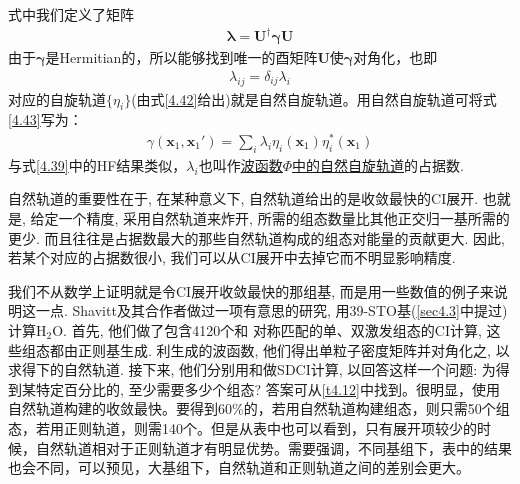 式中我们定义了矩阵
\begin{align}
\bm{\lambda} = \mathbf{U^\dagger}\bm{\gamma}\mathbf{U}
\end{align}
由于$\bm{\gamma}$是Hermitian的，所以能够找到唯一的酉矩阵$\mathbf{U}$使$\bm{\gamma}$对角化，也即
\begin{align}
\lambda_{ij} = \delta_{ij}\lambda_i
\end{align}
对应的自旋轨道$\{\eta_i\}$(由式\eqref{4.42}给出)就是自然自旋轨道。用自然自旋轨道可将式\eqref{4.43}写为：
\begin{align}
\gamma(\mathbf{x}_1,\mathbf{x}_1') = \sum_i \lambda_i \eta_i(\mathbf{x}_1) \eta_i^*(\mathbf{x}_1)
\end{align}
与式\eqref{4.39}中的HF结果类似，$\lambda_i$也叫作\underline{\underline{波函数$\Phi$}中的\underline{自然自旋轨道}}的占据数.

自然轨道的重要性在于, 在某种意义下, 自然轨道给出的是收敛最快的CI展开. 也就是, 给定一个精度, 采用自然轨道来炸开, 所需的组态数量比其他正交归一基所需的更少. 而且往往是占据数最大的那些自然轨道构成的组态对能量的贡献更大. 因此, 若某个对应的占据数很小, 我们可以从CI展开中去掉它而不明显影响精度.

我们不从数学上证明就是令CI展开收敛最快的那组基, 而是用一些数值的例子来说明这一点. Shavitt及其合作者做过一项有意思的研究, 用39-STO基(\ref{sec4.3}中提过)计算$\mathrm{H_2O}$. 首先, 他们做了包含4120个和\mci
{对称匹配}的单、双激发组态的CI计算, 这些组态都由正则\hft 基生成. 利生成的波函数, 他们得出单粒子密度矩阵并对角化之, 以求得下的自然轨道. 接下来, 他们分别用和做SDCI计算, 以回答这样一个问题: 为得到某特定百分比的, 至少需要多少个组态? 答案可从\ref{t4.12}中找到。很明显，使用自然轨道构建的收敛最快。要得到60\%的，若用自然轨道构建组态，则只需50个组态，若用正则轨道，则需140个。但是从表中也可以看到，只有展开项较少的时候，自然轨道相对于正则轨道才有明显优势。需要强调，不同基组下，表中的结果也会不同，可以预见，大基组下，自然轨道和正则轨道之间的差别会更大。

